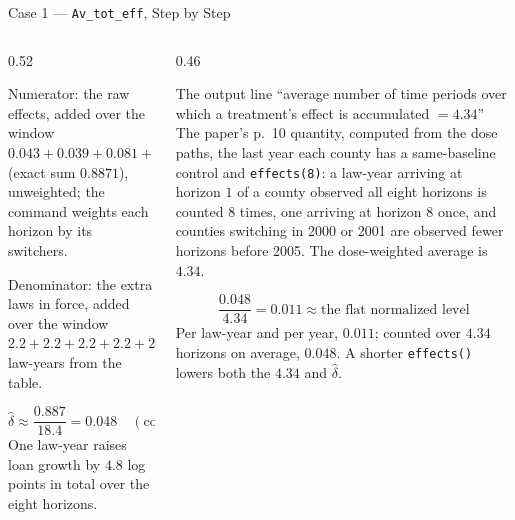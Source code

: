 \documentclass[main.tex]{subfiles}
\begin{document}
\begin{frame}{Case 1 --- \texttt{Av\_tot\_eff}, Step by Step}

  \footnotesize
  \begin{columns}[T]
    \begin{column}{0.52\textwidth}
      \begin{block}{\footnotesize Numerator: the raw effects, added over the window}
        \footnotesize
        $0.043 + 0.039 + 0.081 + 0.071 + 0.148 + 0.163 + 0.157 + 0.186 \approx 0.887$ (exact sum $0.8871$),
        unweighted; the command weights each horizon by its switchers.
      \end{block}

      \smallskip
      \begin{block}{\footnotesize Denominator: the extra laws in force, added over the window}
        \footnotesize
        $2.2 + 2.2 + 2.2 + 2.2 + 2.2 + 2.4 + 2.5 + 2.5 = 18.4$ law-years from
        the table.
      \end{block}

      \smallskip
      \[
        \hat\delta \approx \frac{0.887}{18.4} = 0.048
        \quad (\text{command, switcher-weighted: } 0.0478)
      \]
      One law-year raises loan growth by $4.8$ log points in total over the
      eight horizons.
    \end{column}
    \begin{column}{0.46\textwidth}
      \begin{block}{\footnotesize The output line ``average number of time periods over which a treatment's effect is accumulated $= 4.34$''}
        \footnotesize
        The paper's p.~10 quantity, computed from the dose paths, the last
        year each county has a same-baseline control and \texttt{effects(8)}: a law-year
        arriving at horizon $1$ of a county observed all eight horizons is
        counted $8$ times, one arriving at horizon $8$ once, and counties
        switching in 2000 or 2001 are observed fewer horizons before 2005.
        The dose-weighted average is $4.34$.
      \end{block}

      \smallskip
      \[
        \frac{0.048}{4.34} = 0.011 \approx \text{the flat normalized level}
      \]
      Per law-year and per year, $0.011$; counted over $4.34$ horizons on
      average, $0.048$. A shorter \texttt{effects()} lowers both the $4.34$
      and $\hat\delta$.
    \end{column}
  \end{columns}

\end{frame}
\end{document}
